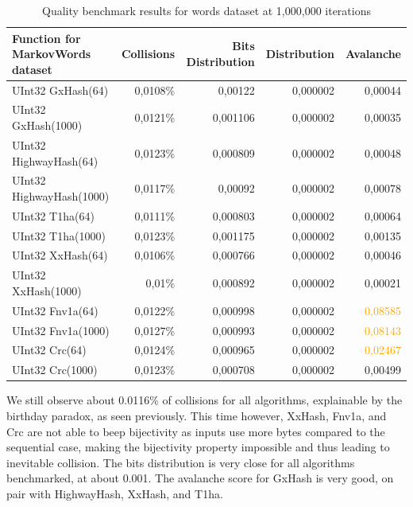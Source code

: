 \documentclass[10pt]{article}
\begin{document}
\begin{table}[H]
\centering
\begin{tabular}{|l|r|r|r|r|}
\hline
\textbf{Function for MarkovWords dataset} & \textbf{Collisions} & \textbf{Bits Distribution} & \textbf{Distribution} & \textbf{Avalanche} \\
\hline
UInt32 GxHash(64)                & 0,0108\% & 0,00122  & 0,000002 & 0,00044 \\
UInt32 GxHash(1000)              & 0,0121\% & 0,001106  & 0,000002 & 0,00035 \\
UInt32 HighwayHash(64)            & 0,0123\% & 0,000809  & 0,000002 & 0,00048 \\
UInt32 HighwayHash(1000)          & 0,0117\% & 0,00092   & 0,000002 & 0,00078 \\
UInt32 T1ha(64)                   & 0,0111\% & 0,000803  & 0,000002 & 0,00064 \\
UInt32 T1ha(1000)                 & 0,0123\% & 0,001175  & 0,000002 & 0,00135 \\
UInt32 XxHash(64)                & 0,0106\% & 0,000766  & 0,000002 & 0,00046 \\
UInt32 XxHash(1000)              & 0,01\%   & 0,000892  & 0,000002 & 0,00021 \\
UInt32 Fnv1a(64)                 & 0,0122\% & 0,000998  & 0,000002 & \textcolor{orange}{0,08585} \\
UInt32 Fnv1a(1000)               & 0,0127\% & 0,000993  & 0,000002 & \textcolor{orange}{0,08143} \\
UInt32 Crc(64)                   & 0,0124\% & 0,000965  & 0,000002 & \textcolor{orange}{0,02467} \\
UInt32 Crc(1000)                 & 0,0123\% & 0,000708  & 0,000002 & 0,00499 \\
\hline
\end{tabular}
\caption{Quality benchmark results for words dataset at 1,000,000 iterations}
\label{tab:scores-words}
\end{table}

We still observe about 0.0116\% of collisions for all algorithms, explainable by the birthday paradox, as seen previously. This time however, XxHash\cite{xxhash}, Fnv1a, and Crc are not able to beep bijectivity as inputs use more bytes compared to the sequential case, making the bijectivity property impossible and thus leading to inevitable collision.
The bits distribution is very close for all algorithms benchmarked, at about 0.001. The avalanche score for GxHash is very good, on pair with HighwayHash\cite{highwayhash}, XxHash\cite{xxhash}, and T1ha\cite{rust-t1ha}.
\end{document}
